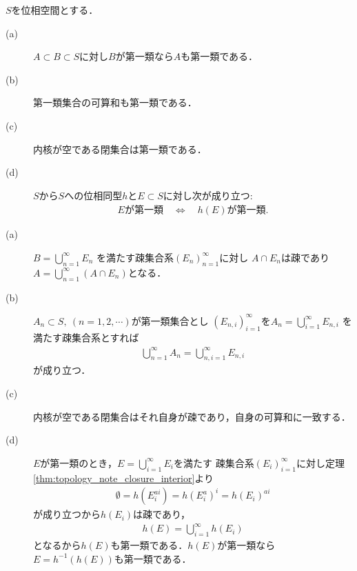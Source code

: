 	\begin{screen}
		\begin{thm}[第一類集合の性質]
			$S$を位相空間とする．
			\begin{description}
				\item[(a)] $A \subset B \subset S$に対し$B$が第一類なら$A$も第一類である．
				\item[(b)] 第一類集合の可算和も第一類である．
				\item[(c)] 内核が空である閉集合は第一類である．
				\item[(d)] $S$から$S$への位相同型$h$と$E \subset S$に対し次が成り立つ:
					\begin{align}
						\mbox{$E$が第一類} \quad \Longleftrightarrow \quad
						\mbox{$h(E)$が第一類}.
					\end{align}
			\end{description}
		\end{thm}
	\end{screen}
	
	\begin{prf}\mbox{}
		\begin{description}
			\item[(a)] $B = \bigcup_{n=1}^\infty E_n$
				を満たす疎集合系$(E_n)_{n=1}^\infty$に対し
				$A \cap E_n$は疎であり$A = \bigcup_{n=1}^\infty (A \cap E_n)$となる．
			\item[(b)] $A_n \subset S,\ (n=1,2,\cdots)$が第一類集合とし
				$(E_{n,i})_{i=1}^\infty$を$A_n = \bigcup_{i=1}^\infty E_{n,i}$
				を満たす疎集合系とすれば
				\begin{align}
					\bigcup_{n=1}^\infty A_n
					= \bigcup_{n,i=1}^\infty E_{n,i}
				\end{align}
				が成り立つ．
				
			\item[(c)] 内核が空である閉集合はそれ自身が疎であり，自身の可算和に一致する．
			\item[(d)] $E$が第一類のとき，$E = \bigcup_{i=1}^\infty E_i$を満たす
				疎集合系$(E_i)_{i=1}^\infty$に対し定理\ref{thm:topology_note_closure_interior}より
				\begin{align}
					\emptyset = h(E_i^{ai})
					= h(E_i^a)^i
					= h(E_i)^{ai}
				\end{align}
				が成り立つから$h(E_i)$は疎であり，
				\begin{align}
					h(E) = \bigcup_{i=1}^\infty h(E_i)
				\end{align}
				となるから$h(E)$も第一類である．$h(E)$が第一類なら$E = h^{-1}(h(E))$も第一類である．
				\QED
		\end{description}
	\end{prf}
	
